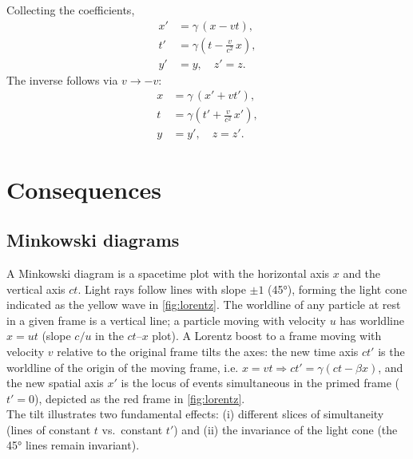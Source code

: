 \documentclass[12pt,
               open=any,
               twoside,
               a4paper,
               titlepage,
               bibliography=totoc,
               xcolor=dvipsnames,
               ]{scrartcl}
\theoremstyle{definition}
\theoremstyle{definition}
\begin{document}
			Collecting the coefficients,
			\begin{equation}
				\boxed{
					\begin{aligned}
						x' &= \gamma\,(x - v t),\\
						t' &= \gamma\!\left(t - \frac{v}{c^2}\,x\right),\\
						y'&=y,\quad z'=z.
				\end{aligned}}
				\label{eq:lorentz}
			\end{equation}
			The inverse follows via $v\to -v$:
			\begin{equation}
				\boxed{
					\begin{aligned}
						x &= \gamma\,(x' + v t'),\\
						t &= \gamma\!\left(t' + \frac{v}{c^2}\,x'\right),\\
						y&=y',\quad z=z'. 
				\end{aligned}}
				\label{eq:inverselorentz}
			\end{equation}
			
\vspace*{1cm}
			
		\section{Consequences}
		
			\subsection{Minkowski diagrams}
			\label{subsec:minkowski}
			
				A Minkowski diagram is a spacetime plot with the horizontal axis $x$ and the vertical axis $ct$. Light rays follow lines with slope $\pm 1$ (45°), forming the light cone indicated as the yellow wave in \autoref{fig:lorentz}. The worldline of any particle at rest in a given frame is a vertical line; a particle moving with velocity $u$ has worldline $x = u t$ (slope $c/u$ in the $ct$–$x$ plot). A Lorentz boost to a frame moving with velocity $v$ relative to the original frame tilts the axes: the new time axis $ct'$ is the worldline of the origin of the moving frame, i.e. $x = vt \Rightarrow ct'=\gamma(ct-\beta x)$, and the new spatial axis $x'$ is the locus of events simultaneous in the primed frame ($t'=0$), depicted as the \textcolor[RGB]{165,0,0}{red} frame in \autoref{fig:lorentz}.\\
				The tilt illustrates two fundamental effects: (i) different slices of simultaneity (lines of constant $t$ vs.\ constant $t'$) and (ii) the invariance of the light cone (the 45° lines remain invariant).
				
\end{document}
